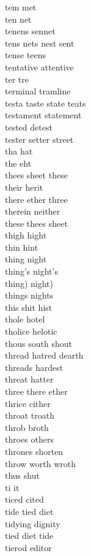 tem met\\
ten net\\
tenens sennet\\
tens nets nest sent\\
tense teens\\
tentative attentive\\
ter tre\\
terminal tramline\\
testa taste state teats\\
testament statement\\
tested detest\\
tester setter street\\
tha hat\\
the eht\\
thees sheet these\\
their herit\\
there ether three\\
therein neither\\
these thees sheet\\
thigh hight\\
thin hint\\
thing night\\
thing's night's\\
thing) night)\\
things nights\\
this shit hist\\
thole hotel\\
tholice helotic\\
thous south shout\\
thread hatred dearth\\
threads hardest\\
threat hatter\\
three there ether\\
thrice cither\\
throat troath\\
throb broth\\
throes others\\
thrones shorten\\
throw worth wroth\\
thus shut\\
ti it\\
ticed cited\\
tide tied diet\\
tidying dignity\\
tied diet tide\\
tierod editor\\
